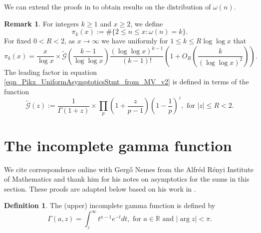 \documentclass[11pt,reqno,a4letter]{article}
\numberwithin{equation}{section}
\numberwithin{figure}{section}
\numberwithin{table}{section}
\theoremstyle{plain}
\numberwithin{theorem}{section}
\theoremstyle{definition}
\newtheorem{remark}[theorem]{Remark}
\newtheorem{definition}[theorem]{Definition}
\begin{document}
We can extend the proofs in \cite[\S 7]{MV} to obtain 
results on the distribution of $\omega(n)$. 

\begin{remark} 
\label{remark_MV_Pikx_FuncResultsAnnotated_v1} 
For integers $k  \geq 1$ and $x \geq 2$, we define 
\[
\pi_k(x) := \#\{2 \leq n \leq x: \omega(n)=k\}.
\]
For fixed $0 < R < 2$, as $x \rightarrow \infty$ we have 
uniformly for $1 \leq k \leq R\log\log x$ that 
\begin{equation}
\label{eqn_Pikx_UniformAsymptoticsStmt_from_MV_v2} 
\pi_k(x) = \frac{x}{\log x} \times 
     \widetilde{\mathcal{G}}\left(\frac{k-1}{\log\log x}\right) 
     \frac{(\log\log x)^{k-1}}{(k-1)!} \left( 
     1 + O_R\left(\frac{k}{(\log\log x)^2}\right) 
     \right). 
\end{equation}
The leading factor in 
equation \eqref{eqn_Pikx_UniformAsymptoticsStmt_from_MV_v2} 
is defined in terms of the function 
\[
\widetilde{\mathcal{G}}(z) := \frac{1}{\Gamma(1+z)} \times 
	\prod_p \left(1 + \frac{z}{p-1}\right) \left(1 - \frac{1}{p}\right)^{z}, 
	\text{ for } |z| \leq R < 2. 
\]
\end{remark} 

\section{The incomplete gamma function} 
\label{subSection_OtherFactsAndResults} 

We cite correspondence online with Gerg\H{o} Nemes 
from the Alfr\'{e}d R\'{e}nyi Institute of Mathematics and thank him for his 
notes on asymptotics for the sums in this section. 
These proofs are adapted below based on his work in 
\cite{NEMES2015C,NEMES2016,NEMES2019}. 

\begin{definition}
The (upper) incomplete gamma function is defined by \cite[\S 8.4]{NISTHB} 
\[
\Gamma(a, z) = \int_{z}^{\infty} t^{a-1} e^{-t} dt, \text{ for } 
	a \in \mathbb{R} \text{ and } |\arg z| < \pi.  
\]
\end{definition}
\end{document}
